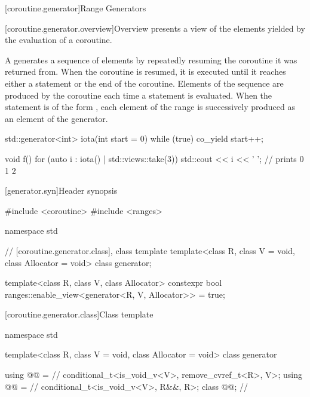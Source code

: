 \documentclass{wg21}
\begin{document}
\begin{addedblock}
[coroutine.generator]{Range Generators}

[coroutine.generator.overview]{Overview}
 presents a view of the elements yielded
by the evaluation of a coroutine.

A  generates a sequence of elements by
repeatedly resuming the coroutine it was returned from.
When the coroutine is resumed, it is executed until it reaches
either a  statement or the end of the coroutine.
Elements of the sequence are produced by the coroutine
each time a  statement is evaluated.
When the  statement is of the form
,
each element of the range 
is successively produced
as an element of the generator.

\begin{example}
    \begin{codeblock}
        std::generator<int> iota(int start = 0) {
            while (true)
                co_yield start++;
        }

        void f() {
            for (auto i : iota() | std::views::take(3))
                std::cout << i << ' '; // prints 0 1 2
        }
    \end{codeblock}
\end{example}

[generator.syn]{Header  synopsis}

\begin{codeblock}
#include <coroutine>
#include <ranges>

namespace std {
  // [coroutine.generator.class], class template 
  template<class R, class V = void, class Allocator = void>
  class generator;

  template<class R, class V, class Allocator>
  constexpr bool ranges::enable_view<generator<R, V, Allocator>> = true;
}
\end{codeblock}

[coroutine.generator.class]{Class template }

\begin{codeblock}
namespace std {
  template<class R, class V = void, class Allocator = void>
  class generator {
    using @@ =       // \expos
      conditional_t<is_void_v<V>, remove_cvref_t<R>, V>;
    using @@ =   // \expos
      conditional_t<is_void_v<V>, R&&, R>;
    class @@;     // \expos

}}
\end{codeblock}
\end{addedblock}
\end{document}
